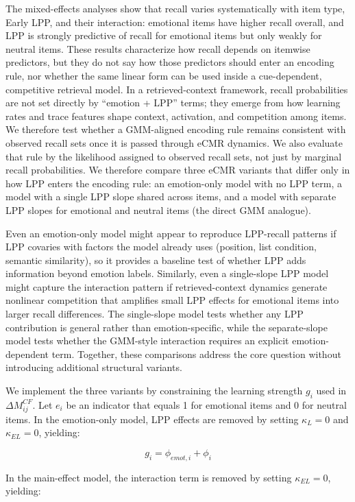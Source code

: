 \documentclass[
  man,
  longtable,
  nolmodern,
  notxfonts,
  notimes,
  draftfirst,
  colorlinks=true,linkcolor=blue,citecolor=blue,urlcolor=blue]{apa7}
\begin{document}
The mixed-effects analyses show that recall varies systematically with
item type, Early LPP, and their interaction: emotional items have higher
recall overall, and LPP is strongly predictive of recall for emotional
items but only weakly for neutral items. These results characterize how
recall depends on itemwise predictors, but they do not say how those
predictors should enter an encoding rule, nor whether the same linear
form can be used inside a cue-dependent, competitive retrieval model. In
a retrieved-context framework, recall probabilities are not set directly
by ``emotion + LPP'' terms; they emerge from how learning rates and
trace features shape context, activation, and competition among items.
We therefore test whether a GMM-aligned encoding rule remains consistent
with observed recall sets once it is passed through eCMR dynamics. We
also evaluate that rule by the likelihood assigned to observed recall
sets, not just by marginal recall probabilities. We therefore compare
three eCMR variants that differ only in how LPP enters the encoding
rule: an emotion-only model with no LPP term, a model with a single LPP
slope shared across items, and a model with separate LPP slopes for
emotional and neutral items (the direct GMM analogue).

Even an emotion-only model might appear to reproduce LPP-recall patterns
if LPP covaries with factors the model already uses (position, list
condition, semantic similarity), so it provides a baseline test of
whether LPP adds information beyond emotion labels. Similarly, even a
single-slope LPP model might capture the interaction pattern if
retrieved-context dynamics generate nonlinear competition that amplifies
small LPP effects for emotional items into larger recall differences.
The single-slope model tests whether any LPP contribution is general
rather than emotion-specific, while the separate-slope model tests
whether the GMM-style interaction requires an explicit emotion-dependent
term. Together, these comparisons address the core question without
introducing additional structural variants.

We implement the three variants by constraining the learning strength
\(g_i\) used in \(\Delta M^{CF}_{ij}\). Let \(e_i\) be an indicator that
equals 1 for emotional items and 0 for neutral items. In the
emotion-only model, LPP effects are removed by setting \(\kappa_L = 0\)
and \(\kappa_{EL} = 0\), yielding:

\[
g_i = \phi_{emot,i} + \phi_i
\]

In the main-effect model, the interaction term is removed by setting
\(\kappa_{EL} = 0\), yielding:
\end{document}
